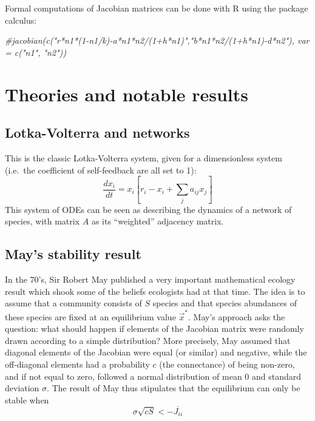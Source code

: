 \documentclass[
]{book}
\newenvironment{Shaded}{\begin{snugshade}}{\end{snugshade}}
\newcommand{\CommentTok}[1]{\textcolor[rgb]{0.56,0.35,0.01}{\textit{#1}}}
\theoremstyle{definition}
\theoremstyle{definition}
\theoremstyle{definition}
\theoremstyle{definition}
\theoremstyle{remark}
\begin{document}
Formal computations of Jacobian matrices can be done with R using the package calculus:

\begin{Shaded}
\begin{Highlighting}[]
\CommentTok{\#jacobian(c("r*n1*(1{-}n1/k){-}a*n1*n2/(1+h*n1)","b*n1*n2/(1+h*n1){-}d*n2"), var = c("n1", "n2"))}
\end{Highlighting}
\end{Shaded}

\section{Theories and notable results}\label{theories-and-notable-results}

\subsection{Lotka-Volterra and networks}\label{lotka-volterra-and-networks}

This is the classic Lotka-Volterra system, given for a dimensionless system (i.e.~the coefficient of self-feedback are all set to 1):
\[\frac{dx_i}{dt} = x_i \left[ r_i - x_i + \sum_j a_{ij}x_j\right]\]
This system of ODEs can be seen as describing the dynamics of a network of species, with matrix \(A\) as its ``weighted'' adjacency matrix.

\subsection{May's stability result}\label{mays-stability-result}

In the 70's, Sir Robert May published a very important mathematical ecology result which shook some of the beliefs ecologists had at that time.
The idea is to assume that a community consists of \(S\) species and that species abundances of these species are fixed at an equilibrium value \(\overrightarrow{x}^*\). May's approach asks the question: what should happen if elements of the Jacobian matrix were randomly drawn according to a simple distribution? More precisely, May assumed that diagonal elements of the Jacobian were equal (or similar) and negative, while the off-diagonal elements had a probability \(c\) (the connectance) of being non-zero, and if not equal to zero, followed a normal distribution of mean 0 and standard deviation \(\sigma\).
The result of May thus stipulates that the equilibrium can only be stable when
\[\begin{equation} 
\sigma \sqrt{cS} < -\overline{J_{ii}} 
\end{equation}\]
\end{document}
